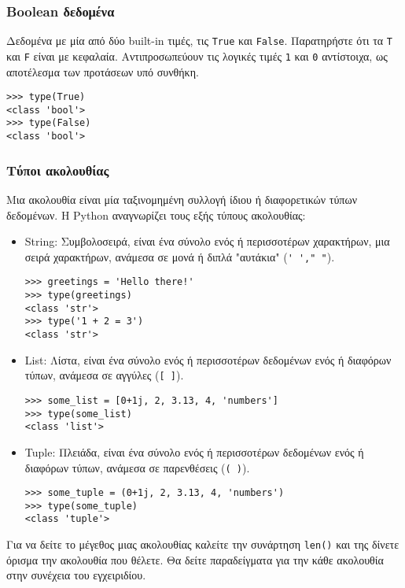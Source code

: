 \documentclass[14pt]{extreport}
\begin{document}
\subsubsection{Boolean δεδομένα}
Δεδομένα με μία από δύο built-in τιμές, τις \lstinline{True} και \lstinline{False}. Παρατηρήστε ότι τα \lstinline{T} και \lstinline{F} είναι με κεφαλαία. Αντιπροσωπεύουν τις λογικές τιμές \lstinline{1} και \lstinline{0} αντίστοιχα, ως αποτέλεσμα των προτάσεων υπό συνθήκη.
\begin{lstlisting}[numbers=none]
>>> type(True)
<class 'bool'>
>>> type(False)
<class 'bool'>        
\end{lstlisting}

\subsubsection{Τύποι ακολουθίας}

Μια ακολουθία είναι μία ταξινομημένη συλλογή ίδιου ή διαφορετικών τύπων δεδομένων. Η Python αναγνωρίζει τους εξής τύπους ακολουθίας:

\begin{itemize}\itemsep0cm
    \item String: Συμβολοσειρά, είναι ένα σύνολο ενός ή περισσοτέρων χαρακτήρων, μια σειρά χαρακτήρων, ανάμεσα σε μονά ή διπλά "αυτάκια" (\lstinline[language={}]{' '," "}).
          \begin{lstlisting}[numbers=none]
>>> greetings = 'Hello there!'
>>> type(greetings)
<class 'str'>
>>> type('1 + 2 = 3')
<class 'str'>
\end{lstlisting}
    \item List: Λίστα, είναι ένα σύνολο ενός ή περισσοτέρων δεδομένων ενός ή διαφόρων τύπων, ανάμεσα σε αγγύλες (\lstinline[language={}]{[ ]}).
          \begin{lstlisting}[numbers=none]
>>> some_list = [0+1j, 2, 3.13, 4, 'numbers']
>>> type(some_list)
<class 'list'>    
\end{lstlisting}
    \item Tuple: Πλειάδα, είναι ένα σύνολο ενός ή περισσοτέρων δεδομένων ενός ή διαφόρων τύπων, ανάμεσα σε παρενθέσεις (\lstinline[language={}]{( )}).
          \begin{lstlisting}[numbers=none]
>>> some_tuple = (0+1j, 2, 3.13, 4, 'numbers')
>>> type(some_tuple)
<class 'tuple'>    
\end{lstlisting}
\end{itemize}

Για να δείτε το μέγεθος μιας ακολουθίας καλείτε την συνάρτηση \lstinline{len()} και της δίνετε όρισμα την ακολουθία που θέλετε. Θα δείτε παραδείγματα για την κάθε ακολουθία στην συνέχεια του εγχειριδίου.
\end{document}
